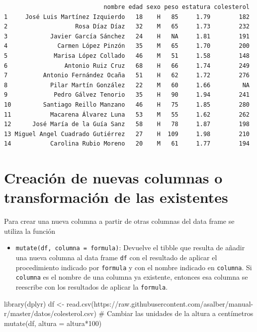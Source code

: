 \documentclass[
  a4paper,
]{scrreport}
\newenvironment{Shaded}{\begin{snugshade}}{\end{snugshade}}
\newcommand{\AttributeTok}[1]{\textcolor[rgb]{0.40,0.45,0.13}{#1}}
\newcommand{\CommentTok}[1]{\textcolor[rgb]{0.37,0.37,0.37}{#1}}
\newcommand{\DecValTok}[1]{\textcolor[rgb]{0.68,0.00,0.00}{#1}}
\newcommand{\FunctionTok}[1]{\textcolor[rgb]{0.28,0.35,0.67}{#1}}
\newcommand{\NormalTok}[1]{\textcolor[rgb]{0.00,0.23,0.31}{#1}}
\newcommand{\OtherTok}[1]{\textcolor[rgb]{0.00,0.23,0.31}{#1}}
\newcommand{\SpecialCharTok}[1]{\textcolor[rgb]{0.37,0.37,0.37}{#1}}
\newcommand{\StringTok}[1]{\textcolor[rgb]{0.13,0.47,0.30}{#1}}
\providecommand{\tightlist}{%
  \setlength{\itemsep}{0pt}\setlength{\parskip}{0pt}}\usepackage{longtable,booktabs,array}
\theoremstyle{definition}
\theoremstyle{definition}
\theoremstyle{remark}
\begin{document}
\begin{verbatim}
                            nombre edad sexo peso estatura colesterol
1     José Luis Martínez Izquierdo   18    H   85     1.79        182
2                   Rosa Díaz Díaz   32    M   65     1.73        232
3            Javier García Sánchez   24    H   NA     1.81        191
4              Carmen López Pinzón   35    M   65     1.70        200
5             Marisa López Collado   46    M   51     1.58        148
6                Antonio Ruiz Cruz   68    H   66     1.74        249
7          Antonio Fernández Ocaña   51    H   62     1.72        276
8            Pilar Martín González   22    M   60     1.66         NA
9             Pedro Gálvez Tenorio   35    H   90     1.94        241
10         Santiago Reillo Manzano   46    H   75     1.85        280
11           Macarena Álvarez Luna   53    M   55     1.62        262
12      José María de la Guía Sanz   58    H   78     1.87        198
13 Miguel Angel Cuadrado Gutiérrez   27    H  109     1.98        210
14           Carolina Rubio Moreno   20    M   61     1.77        194
\end{verbatim}

\hypertarget{creaciuxf3n-de-nuevas-columnas-o-transformaciuxf3n-de-las-existentes}{%
\section{Creación de nuevas columnas o transformación de las
existentes}\label{creaciuxf3n-de-nuevas-columnas-o-transformaciuxf3n-de-las-existentes}}

Para crear una nueva columna a partir de otras columnas del data frame
se utiliza la función

\begin{itemize}
\tightlist
\item
  \texttt{mutate(df,\ columna\ =\ formula)}: Devuelve el tibble que
  resulta de añadir una nueva columna al data frame \texttt{df} con el
  resultado de aplicar el procedimiento indicado por \texttt{formula} y
  con el nombre indicado en \texttt{columna}. Si \texttt{columna} es el
  nombre de una columna ya existente, entonces esa columna se reescribe
  con los resultados de aplicar la \texttt{formula}.
\end{itemize}

\begin{Shaded}
\begin{Highlighting}[]
\FunctionTok{library}\NormalTok{(dplyr)}
\NormalTok{df }\OtherTok{\textless{}{-}} \FunctionTok{read.csv}\NormalTok{(}\StringTok{\textquotesingle{}https://raw.githubusercontent.com/asalber/manual{-}r/master/datos/colesterol.csv\textquotesingle{}}\NormalTok{)}
\CommentTok{\# Cambiar las unidades de la altura a centímetros}
\FunctionTok{mutate}\NormalTok{(df, }\AttributeTok{altura =}\NormalTok{ altura}\SpecialCharTok{*}\DecValTok{100}\NormalTok{)}
\end{Highlighting}
\end{Shaded}
\end{document}
